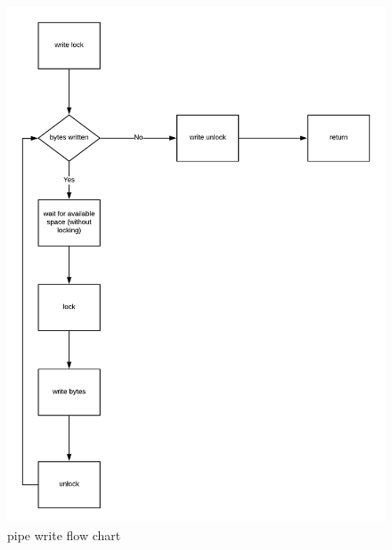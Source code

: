\begin{figure}[htp]
\centering
\includegraphics[scale=0.7]{figures/pipe_write.png}
\caption{pipe write flow chart\label{fig4_7}}
\end{figure}

